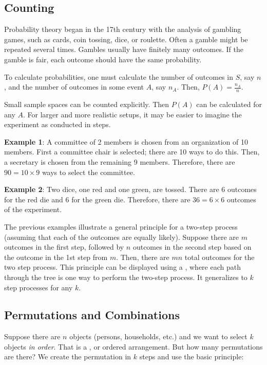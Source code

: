 \subsection{Counting}
Probability theory began in the 17th century with the analysis of gambling games, such as cards, coin tossing, dice, or roulette. Often a gamble might be repeated several times. Gambles usually have finitely many outcomes. If the gamble is fair, each outcome should have the same probability.

To calculate probabilities, one must calculate the number of outcomes in $S$, say $n$, and the number of outcomes in some event $A$, say $n_{A}$. Then, $P(A)=\frac{n_{A}}{n}$.

Small sample spaces can be counted explicitly. Then $P(A)$ can be calculated for any $A$. For larger and more realistic setups, it may be easier to imagine the experiment as conducted in steps.

\textbf{Example 1}: A committee of 2 members is chosen from an organization of 10 members. First a committee chair is selected; there are 10 ways to do this. Then, a secretary is chosen from the remaining 9 members. Therefore, there are $90 = 10\times9$ ways to select the committee.

\textbf{Example 2}: Two dice, one red and one green, are tossed. There are 6 outcomes for the red die and 6 for the green die. Therefore, there are $36=6\times6$ outcomes of the experiment.

The previous examples illustrate a general principle for a two-step process (assuming that each of the outcomes are equally likely). Suppose there are $m$ outcomes in the first step, followed by $n$ outcomes in the second step based on the outcome in the 1st step from $m$. Then, there are $mn$ total outcomes for the two step process. This principle can be displayed using a , where each path through the tree is one way to perform the two-step process. It generalizes to $k$ step processes for any $k$.

\subsection{Permutations and Combinations}
Suppose there are $n$ objects (persons, households, etc.) and we want to select $k$ objects \textit{in order}. That is a , or ordered arrangement. But how many permutations are there? We create the permutation in $k$ steps and use the basic principle:


